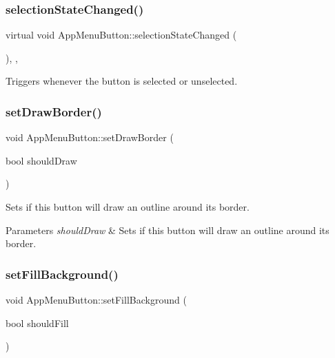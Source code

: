 \subsubsection{\texorpdfstring{selection\+State\+Changed()}{selectionStateChanged()}}
{\footnotesize\ttfamily virtual void App\+Menu\+Button\+::selection\+State\+Changed (\begin{DoxyParamCaption}{ }\end{DoxyParamCaption})\hspace{0.3cm}{\ttfamily [inline]}, {\ttfamily [protected]}, {\ttfamily [virtual]}}

Triggers whenever the button is selected or unselected. \mbox{\label{classAppMenuButton_a67d3f396b0c87a25c67e1867d01bff73}} 
\subsubsection{\texorpdfstring{set\+Draw\+Border()}{setDrawBorder()}}
{\footnotesize\ttfamily void App\+Menu\+Button\+::set\+Draw\+Border (\begin{DoxyParamCaption}\item[{bool}]{should\+Draw }\end{DoxyParamCaption})\hspace{0.3cm}{\ttfamily [protected]}}

Sets if this button will draw an outline around its border.


\begin{DoxyParams}{Parameters}
{\em should\+Draw} & Sets if this button will draw an outline around its border. \\
\hline
\end{DoxyParams}
\mbox{\label{classAppMenuButton_abb921087445de1a6f25674ea36f26c8f}} 
\subsubsection{\texorpdfstring{set\+Fill\+Background()}{setFillBackground()}}
{\footnotesize\ttfamily void App\+Menu\+Button\+::set\+Fill\+Background (\begin{DoxyParamCaption}\item[{bool}]{should\+Fill }\end{DoxyParamCaption})\hspace{0.3cm}{\ttfamily [protected]}}

